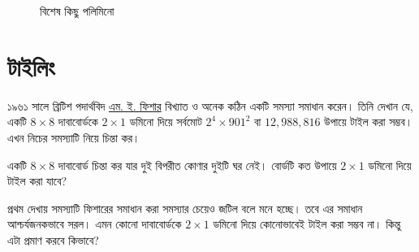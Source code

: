 \documentclass[11pt]{report}
\begin{document}
\begin{figure}[htbp]
    \centering
    \caption{বিশেষ কিছু পলিমিনো}
\end{figure}

\newpage

\section{টাইলিং}
১৯৬১ সালে ব্রিটিশ পদার্থবিদ \href{https://en.wikipedia.org/wiki/Michael_Fisher}{এম. ই. ফিশার} বিখ্যাত ও অনেক কঠিন একটি সমস্যা সমাধান করেন। তিনি দেখান যে, একটি $8 \times 8$ দাবাবোর্ডকে $2 \times 1$ ডমিনো দিয়ে সর্বমোট $2^4 \times 901^2$ বা $12,988,816$ উপায়ে টাইল করা সম্ভব। এখন নিচের সমস্যাটি নিয়ে চিন্তা কর।\\

\begin{tcolorbox}[colframe=black!80!green,title=উদাহরণ 1.2.1]
একটি $8 \times 8$ দাবাবোর্ড চিন্তা কর যার দুই বিপরীত কোণার দুইটি ঘর নেই। বোর্ডটি কত উপায়ে $2 \times 1$ ডমিনো দিয়ে টাইল করা যাবে?
\end{tcolorbox}

প্রথম দেখায় সমস্যাটি ফিশারের সমাধান করা সমস্যার চেয়েও জটিল বলে মনে হচ্ছে। তবে এর সমাধান আশ্চর্যজনকভাবে সরল। এমন কোনো দাবাবোর্ডকে $2 \times 1$ ডমিনো দিয়ে কোনোভাবেই টাইল করা সম্ভব না। কিন্তু এটা প্রমাণ করবে কিভাবে?\\
\end{document}
